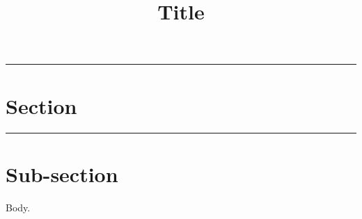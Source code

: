 \documentclass[hidelinks, 11pt, dvipsnames]{article}
\title{Title}
\newcommand{\psection}[1]{{
    \begin{center}
        \noindent \rule{17cm}{0.4pt}
            \section*{\LARGE #1}
        \noindent \rule{17cm}{0.4pt}
    \end{center}
}}
\newcommand{\psubsection}[1]{{\section*{#1}}}
\begin{document}
\maketitle

\psection{Section}

\psubsection{Sub-section}

\noindent
Body.
\end{document}
